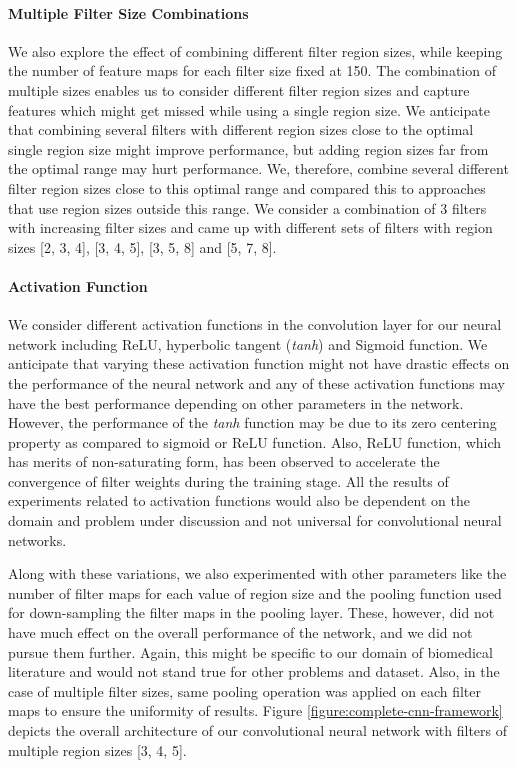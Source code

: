 \paragraph{Multiple Filter Size Combinations}
We also explore the effect of combining different filter region sizes, while keeping the number of feature maps for each filter size fixed at 150. The combination of multiple sizes enables us to consider different filter region sizes and capture features which might get missed while using a single region size. We anticipate that combining several filters with different region sizes close to the optimal single region size might improve performance, but adding region sizes far from the optimal range may hurt performance. We, therefore, combine several different filter region sizes close to this optimal range and compared this to approaches that use region sizes outside this range. We consider a combination of 3 filters with increasing filter sizes and came up with different sets of filters with region sizes [2, 3, 4], [3, 4, 5], [3, 5, 8] and [5, 7, 8].   

\paragraph{Activation Function}
We consider different activation functions in the convolution layer for our neural network including ReLU, hyperbolic tangent ({\it tanh}) and Sigmoid function. We anticipate that varying these activation function might not have drastic effects on the performance of the neural network and any of these activation functions may have the best performance depending on other parameters in the network. However, the performance of the {\it tanh} function may be due to its zero centering property as compared to sigmoid or ReLU function. Also, ReLU function, which has merits of non-saturating form, has been observed to accelerate the convergence of filter weights during the training stage. All the results of experiments related to activation functions would also be dependent on the domain and problem under discussion and not universal for convolutional neural networks.    

Along with these variations, we also experimented with other parameters like the number of filter maps for each value of region size and the pooling function used for down-sampling the filter maps in the pooling layer. These, however, did not have much effect on the overall performance of the network, and we did not pursue them further. Again, this might be specific to our domain of biomedical literature and would not stand true for other problems and dataset. Also, in the case of multiple filter sizes, same pooling operation was applied on each filter maps to ensure the uniformity of results. Figure \ref{figure:complete-cnn-framework} depicts the overall architecture of our convolutional neural network with filters of multiple region sizes [3, 4, 5].

